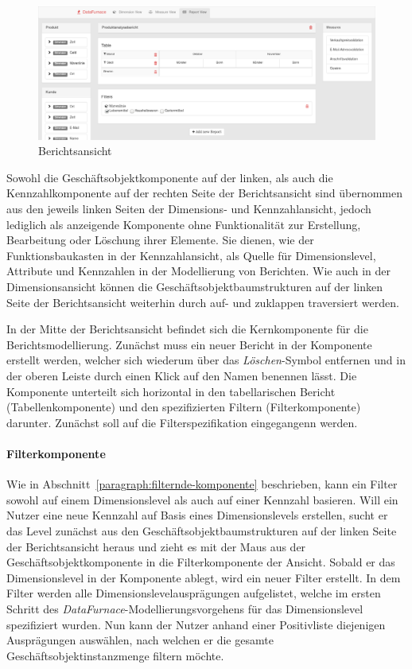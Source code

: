 \documentclass[
  language=german, %
  type=bachelor,%
  ngerman
]{isthesis}
\begin{document}
\begin{content}
  \begin{figure}
    \includegraphics[scale=0.29]{content/figures/report-view.png}
    \caption{Berichtsansicht}\label{berichtsansicht}
  \end{figure}

  Sowohl die Geschäftsobjektkomponente auf der linken, als auch die
  Kennzahlkomponente auf der rechten Seite der Berichtsansicht sind übernommen
  aus den jeweils linken Seiten der Dimensions- und Kennzahlansicht, jedoch
  lediglich als anzeigende Komponente ohne Funktionalität zur Erstellung,
  Bearbeitung oder Löschung ihrer Elemente. Sie dienen, wie der
  Funktionsbaukasten in der Kennzahlansicht, als Quelle für Dimensionslevel,
  Attribute und Kennzahlen in der Modellierung von Berichten. Wie auch in der
  Dimensionsansicht können die Geschäftsobjektbaumstrukturen auf der linken
  Seite der Berichtsansicht weiterhin durch auf- und zuklappen traversiert
  werden.

  In der Mitte der Berichtsansicht befindet sich die Kernkomponente für die
  Berichtsmodellierung. Zunächst muss ein neuer Bericht
  in der Komponente erstellt werden, welcher sich wiederum über das
  \textit{Löschen}-Symbol entfernen und in der oberen Leiste durch einen Klick
  auf den Namen benennen lässt. Die Komponente unterteilt sich horizontal in
  den tabellarischen Bericht (Tabellenkomponente) und den spezifizierten
  Filtern (Filterkomponente) darunter. Zunächst soll auf die
  Filterspezifikation eingegangenn werden. 
  
  \paragraph{Filterkomponente}
  
  Wie in Abschnitt~\ref{paragraph:filternde-komponente}
  beschrieben, kann ein Filter sowohl auf einem Dimensionslevel als auch auf einer
  Kennzahl basieren. Will ein Nutzer eine neue Kennzahl auf Basis eines
  Dimensionslevels erstellen, sucht er das Level zunächst aus den
  Geschäftsobjektbaumstrukturen auf der linken Seite der Berichtsansicht heraus
  und zieht es mit der Maus aus der Geschäftsobjektkomponente in die
  Filterkomponente der Ansicht. Sobald er das Dimensionslevel in der Komponente
  ablegt, wird ein neuer Filter erstellt. In dem Filter werden alle
  Dimensionslevelausprägungen aufgelistet, welche im ersten Schritt des
  \textit{DataFurnace}-Modellierungsvorgehens für das Dimensionslevel
  spezifiziert wurden. Nun kann der Nutzer anhand einer Positivliste
  diejenigen Ausprägungen auswählen, nach welchen er die gesamte
  Geschäftsobjektinstanzmenge filtern möchte.


\end{content}
\end{document}
